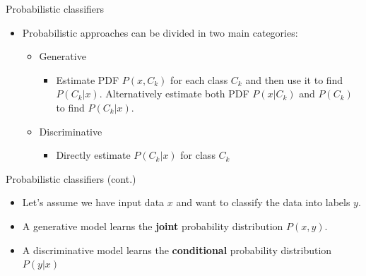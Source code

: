 \documentclass[serif, aspectratio=169]{beamer}
\begin{document}
\begin{frame}{Probabilistic classifiers}
    \begin{itemize}
        \item Probabilistic approaches can be divided in two main categories:
            \begin{itemize}
                \item Generative
                    \begin{itemize}
                        \item Estimate PDF $P(x, C_k)$ for each class $C_k$ and then use it to find $P(C_k|x)$. Alternatively estimate both PDF $P(x|C_k)$ and $P(C_k)$ to find $P(C_k|x)$.
                    \end{itemize}
                \item Discriminative
                    \begin{itemize}
                        \item Directly estimate $P(C_k|x)$ for class $C_k$
                    \end{itemize}
            \end{itemize}
    \end{itemize}
\end{frame}
\begin{frame}{Probabilistic classifiers (cont.)}
    \begin{itemize}
        \item Let's assume we have input data $x$ and want to classify the data into labels $y$.
        \item A generative model learns the \textbf{joint} probability distribution $P(x,y)$.
            
        \item A discriminative model learns the \textbf{conditional} probability distribution $P(y|x)$
           
    \end{itemize}
\end{frame}
\end{document}
